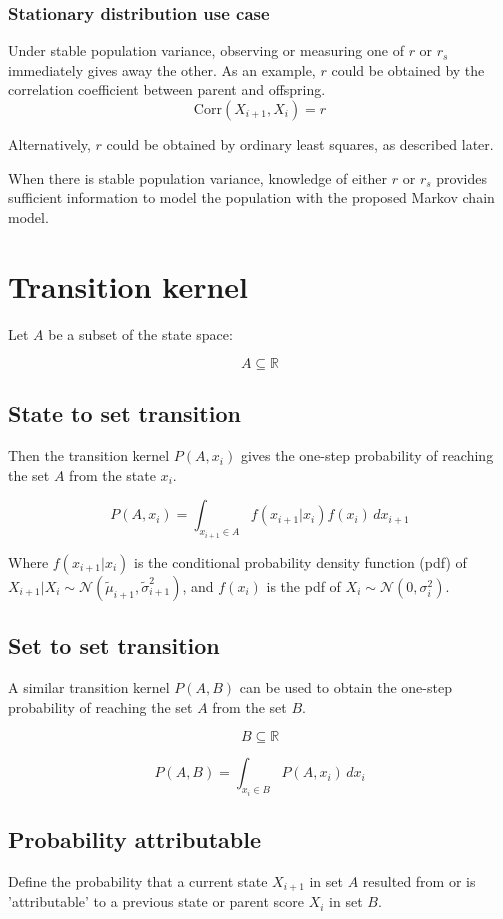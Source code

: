 \documentclass[a4paper,11pt]{article}
\begin{document}
\subsubsection{Stationary distribution use case}
Under stable population variance, observing or measuring one of $r$ or $r_s$ immediately gives away the other. As an example, $r$ could be obtained by the correlation coefficient between parent and offspring.  
$$\mathrm{Corr}(X_{i+1}, X_i) = r$$

Alternatively, $r$ could be obtained by ordinary least squares, as described later.

When there is stable population variance, knowledge of either $r$ or $r_s$ provides sufficient information to model the population with the proposed Markov chain model.


\section{Transition kernel}

Let $A$ be a subset of the state space:

$$A \subseteq \mathbb{R}$$

\subsection{State to set transition}
Then the transition kernel $P(A, x_i)$ gives the one-step probability of reaching the set $A$ from the state $x_i$. 

$$P(A, x_i) = \int_{x_{i+1}\in A}^{} f(x_{i+1}|x_i)f(x_i) \, dx_{i+1}$$

Where $f(x_{i+1}|x_i)$ is the conditional probability density function (pdf) of $X_{i+1}|X_i \sim \mathcal{N}(\tilde{\mu}_{i+1}, \tilde{\sigma}_{i+1}^2)$, and $f(x_i)$ is the pdf of $X_i \sim \mathcal{N}(0, \sigma_i^2)$.

\subsection{Set to set transition}
A similar transition kernel $P(A, B)$ can be used to obtain the one-step probability of reaching the set $A$ from the set $B$. 

$$B \subseteq \mathbb{R}$$

$$P(A, B) = \int_{x_i\in B}^{} P(A, x_i) \, dx_i$$

\subsection{Probability attributable}
Define the probability that a current state $X_{i+1}$ in set $A$ resulted from or is 'attributable' to a previous state or parent score $X_i$ in set $B$.
\end{document}
